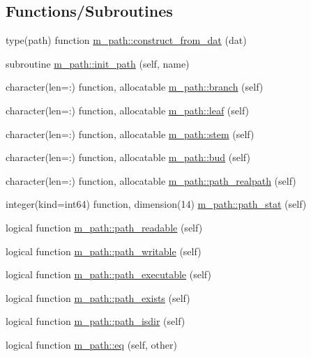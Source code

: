 \subsection*{Functions/\+Subroutines}
\begin{DoxyCompactItemize}
\item 
type(path) function \mbox{\hyperlink{namespacem__path_ae223f8623f7a985d4349e08bc7540d53}{m\+\_\+path\+::construct\+\_\+from\+\_\+dat}} (dat)
\item 
subroutine \mbox{\hyperlink{namespacem__path_ad3027220a3a7decb9dd35ddb41a91250}{m\+\_\+path\+::init\+\_\+path}} (self, name)
\item 
character(len=\+:) function, allocatable \mbox{\hyperlink{namespacem__path_a33fc3c25b98c7441f230b91ddc9c40ad}{m\+\_\+path\+::branch}} (self)
\item 
character(len=\+:) function, allocatable \mbox{\hyperlink{namespacem__path_a162b776783f42fc4fe2d3a1b951a1172}{m\+\_\+path\+::leaf}} (self)
\item 
character(len=\+:) function, allocatable \mbox{\hyperlink{namespacem__path_ac0be359b3514ee777302195a99e583c7}{m\+\_\+path\+::stem}} (self)
\item 
character(len=\+:) function, allocatable \mbox{\hyperlink{namespacem__path_abd678716fe9c893161b30bc80a466097}{m\+\_\+path\+::bud}} (self)
\item 
character(len=\+:) function, allocatable \mbox{\hyperlink{namespacem__path_a54bcb3564054f6540a65dc32354f2a2d}{m\+\_\+path\+::path\+\_\+realpath}} (self)
\item 
integer(kind=int64) function, dimension(14) \mbox{\hyperlink{namespacem__path_a44b09269412e4291dce9ce87de5f6d8f}{m\+\_\+path\+::path\+\_\+stat}} (self)
\item 
logical function \mbox{\hyperlink{namespacem__path_a9e5b51fcb0d98f8a711b9bfbcaa39c66}{m\+\_\+path\+::path\+\_\+readable}} (self)
\item 
logical function \mbox{\hyperlink{namespacem__path_a27ad0b81b3aedd309035fe3dc4d69128}{m\+\_\+path\+::path\+\_\+writable}} (self)
\item 
logical function \mbox{\hyperlink{namespacem__path_abcf12fcdc2f3d90663783ff774b25261}{m\+\_\+path\+::path\+\_\+executable}} (self)
\item 
logical function \mbox{\hyperlink{namespacem__path_a1d3741add7dd7d180b71295c4a1761c6}{m\+\_\+path\+::path\+\_\+exists}} (self)
\item 
logical function \mbox{\hyperlink{namespacem__path_a4e56f4f3db67378cb4f20340a14f4a0f}{m\+\_\+path\+::path\+\_\+isdir}} (self)
\item 
logical function \mbox{\hyperlink{namespacem__path_ac073eb26c4277f48777df68b8e2dfcfd}{m\+\_\+path\+::eq}} (self, other)
\end{DoxyCompactItemize}
